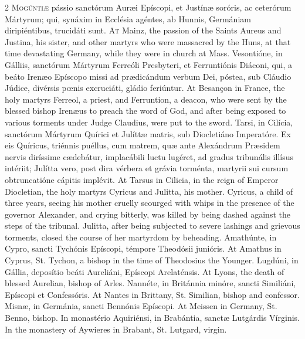 \begin{paracol}{2}
\lettrine[lines=2]{M}{ogúntiæ} pássio 
 sanctórum Auræi Epíscopi, et Justínæ soróris, ac ceterórum Mártyrum; qui, 
 synáxim in Ecclésia agéntes, ab Hunnis, Germániam diripiéntibus, trucidáti 
 sunt.
\switchcolumn
{}
\lettrine[lines=2]{A}{t} Mainz, the passion of the Saints 
 Aureus and Justina, his sister, and other martyrs who were massacred by the 
 Huns, at that time devastating Germany, while they were in church at Mass.
\switchcolumn*
{}
Vesontióne, in Gálliis, 
 sanctórum Mártyrum Ferreóli Presbyteri, et Ferruntiónis Diáconi, qui, a 
 beáto Irenæo Epíscopo missi ad prædicándum verbum Dei, póstea, sub Cláudio 
 Júdice, divérsis pœnis excruciáti, gládio feriúntur.
\switchcolumn
{}
At Besançon in France, the holy 
 martyrs Ferreol, a priest, and Ferruntion, a deacon, who were sent by the 
 blessed bishop Irenæus to preach the word of God, and after being exposed 
 to various torments under Judge Claudius, were put to the sword.
\switchcolumn*
{}
Tarsi, in Cilícia, 
 sanctórum Mártyrum Quírici et Julíttæ matris, sub Diocletiáno Imperatóre. 
 Ex eis Quíricus, triénnis puéllus, cum matrem, quæ ante Alexándrum Præsidem 
 nervis diríssime cædebátur, implacábili luctu lugéret, ad gradus tribunális 
 illísus intériit; Julítta vero, post dira vérbera et grávia torménta, 
 martyrii sui cursum obtruncatióne cápitis implévit.
\switchcolumn
{}
At Tarsus in Cilicia, in the reign 
 of Emperor Diocletian, the holy martyrs Cyricus and Julitta, his mother. 
 Cyricus, a child of three years, seeing his mother cruelly scourged with 
 whips in the presence of the governor Alexander, and crying bitterly, was 
 killed by being dashed against the steps of the tribunal. Julitta, 
 after being subjected to severe lashings and grievous torments, closed the 
 course of her martyrdom by beheading.
\switchcolumn*
{}
Amathúnte, in Cypro, 
 sancti Tychónis Epíscopi, témpore Theodósii junióris.
\switchcolumn
{}
At Amathus in Cyprus, St. Tychon, a 
 bishop in the time of Theodosius the Younger.
\switchcolumn*
{}
Lugdúni, in Gállia, 
 deposítio beáti Aureliáni, Epíscopi Arelaténsis.
\switchcolumn
{}
At Lyons, the death of blessed 
 Aurelian, bishop of Arles.
\switchcolumn*
{}
Nannéte, in Británnia minóre, sancti Similiáni, Epíscopi et Confessóris.
\switchcolumn
{}
At Nantes in Brittany, St. Similian, 
 bishop and confessor.
\switchcolumn*
{}
Misnæ, in Germánia, 
 sancti Bennónis Epíscopi.
\switchcolumn
{}
At Meissen in Germany, St. Benno, 
 bishop.
\switchcolumn*
{}
In monastério 
 Aquiriénsi, in Brabántia, sanctæ Lutgárdis Vírginis.
\switchcolumn
{}
In the monastery of Aywieres in 
 Brabant, St. Lutgard, virgin.
\switchcolumn*
{}
\end{paracol}


